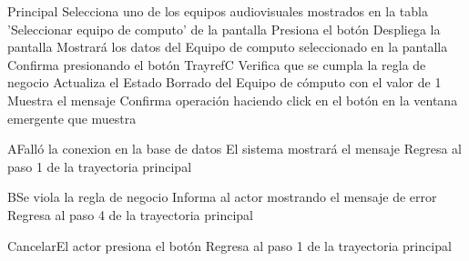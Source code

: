 
\begin{UCtrayectoria}{Principal}
		\UCpaso[\UCactor] Selecciona uno de los equipos audiovisuales mostrados en la tabla 'Seleccionar equipo de computo' de la pantalla 
		\UCpaso[\UCactor] Presiona el botón 
		\UCpaso[\UCsist] Despliega la pantalla 
		\UCpaso[\UCsist] Mostrará los datos del Equipo de computo seleccionado en la pantalla
		\UCpaso[\UCactor] Confirma presionando el botón Trayref{C}
		\UCpaso[\UCsist] Verifica que se cumpla la regla de negocio  
		\UCpaso[\UCactor] Actualiza el Estado Borrado del Equipo de cómputo con el valor de 1 
		\UCpaso[\UCsist] Muestra el mensaje 
		\UCpaso[\UCactor] Confirma operación haciendo click en el botón  en la ventana emergente que muestra
\end{UCtrayectoria}




\begin{UCtrayectoriaA}{A}{Falló la conexion en la base de datos}
			\UCpaso[\UCsist] El sistema mostrará el mensaje 
			\UCpaso[\UCsist] Regresa al paso 1 de la trayectoria principal 
\end{UCtrayectoriaA}


\begin{UCtrayectoriaA}{B}{Se viola la regla de negocio }	
			\UCpaso[\UCsist] Informa al actor mostrando el mensaje de error 
			\UCpaso[\UCsist] Regresa al paso 4 de la trayectoria principal 
\end{UCtrayectoriaA}



\begin{UCtrayectoriaA}{Cancelar}{El actor presiona el botón }
			\UCpaso[\UCsist] Regresa al paso 1 de la trayectoria principal  
\end{UCtrayectoriaA}
